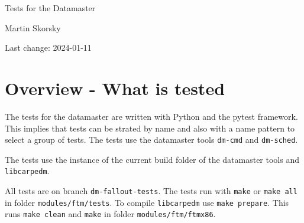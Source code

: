 \documentclass[12pt,a4paper]{report}
\begin{document}
\begin{titlepage}
\vspace{2cm}
\begin{center}
\Huge{Tests for the Datamaster}

\Large{Martin Skorsky}

\Large{Last change: 2024-01-11}
\end{center}
\vfill
\end{titlepage}

\tableofcontents

\chapter{Overview - What is tested}
The tests for the datamaster are written with Python and the pytest framework. This implies that tests can be strated
by name and also with a name pattern to select a group of tests. The tests use the datamaster tools \texttt{dm-cmd}
and \texttt{dm-sched}.

The tests use the instance of the current build folder of the datamaster tools and \texttt{libcarpedm}.

All tests are on branch \texttt{dm-fallout-tests}. The tests run with \texttt{make} or \texttt{make all} in folder \texttt{modules/ftm/tests}.
To compile \texttt{libcarpedm} use \texttt{make prepare}. This runs \texttt{make clean} and \texttt{make} in folder \texttt{modules/ftm/ftmx86}.
\end{document}
